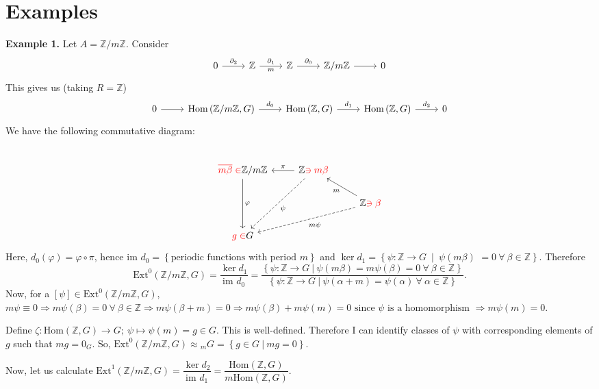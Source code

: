 \documentclass[a4paper,11pt, tikz]{article}
\newcommand{\lb}{\left(}
\newcommand{\rb}{\right)}
\newcommand{\lc}{\left\lbrace}
\newcommand{\rc}{\right\rbrace}
\newcommand{\Z}{\mathbb{Z}}
\renewcommand{\a}{\alpha}
\renewcommand{\b}{\beta}
\newcommand{\f}{\varphi}
\newcommand{\z}{\zeta}
\newcommand{\p}{\pi}
\newcommand{\dl}{\partial}
\newcommand{\Hom}{\text{Hom}}
\newcommand{\Ext}{\text{Ext}}
\newcommand{\im}{\text{im~}}
\renewcommand{\implies}{\Rightarrow}
\newcommand{\tends}{\rightarrow}
\newcommand{\cl}{\overline}
\begin{document}
\section{Examples}
\noindent{}\textbf{Example 1.} Let $A=\Z/m\Z$. Consider
\begin{equation*}
\begin{tikzcd}
0 \arrow[r, "\dl_2"] & \Z \arrow[r, "\dl_1", "m"'] & \Z \arrow[r, "\dl_0"] & {\Z/m\Z} \arrow[r] & 0
\end{tikzcd}
\end{equation*}
This gives us (taking $R=\Z$)
\begin{equation*}
\begin{tikzcd}
0 \arrow[r] & \Hom\lb \Z/m\Z, G\rb\arrow[r, "d_0"] & \Hom\lb \Z, G\rb \arrow[r, "d_1"] & \Hom\lb \Z, G\rb \arrow[r, "d_2"] & 0
\end{tikzcd}
\end{equation*}
We have the following commutative diagram:
\begin{equation*}
\begin{tikzcd}
&  &\\
\color{red}{\cl{m\b}\in}\color{black}{}\Z/m\Z \arrow[dd, "\f"] & \Z\color{red}{\ni m\b}\color{black}{} \arrow[l, "\p"'] \arrow [ddl, dashrightarrow, "\psi"] & \\
& & \Z\color{red}{\ni\b}\color{black}{} \arrow[ul, "m"] \arrow[dll, dashrightarrow, "m\psi"]\\
\color{red}{g\in}\color{black}{} G & &
\end{tikzcd}
\end{equation*}
Here, $d_0\lb \f\rb=\f\circ \pi$, hence $\im d_0=\lc \text{periodic functions with period } m\rc$ and $\ker d_1=\lc \psi: \Z\tends G~\mid~\psi\lb m\b\rb\right.$ $\left.=0~\forall~\b\in\Z\rc$. Therefore
$$\Ext^0\lb \Z/m\Z, G\rb=\dfrac{\ker d_1}{\im d_0}=\dfrac{\lc\psi:\Z\tends G~|~\psi\lb m\b\rb=m\psi\lb \b\rb=0~\forall~\b\in\Z\rc}{\lc \psi:\Z\tends G~|~\psi\lb \a+m\rb=\psi\lb \a\rb~\forall~\a\in\Z\rc}.$$
Now, for a $[\psi]\in\Ext^0\lb \Z/m\Z, G\rb$, $m\psi\equiv 0\implies m\psi\lb \b\rb=0~\forall~\b\in\Z\implies m\psi\lb \b+m\rb=0\implies m\psi(\b)+m\psi(m)=0\text{ since $\psi$ is a homomorphism }\implies m\psi(m)=0$.

Define $\z:\Hom\lb \Z, G\rb\tends G;~\psi\mapsto \psi(m)=g\in G$. This is well-defined. Therefore I can identify classes of $\psi$ with corresponding elements of $g$ such that $mg=0_G$. So, $\Ext^0\lb \Z/m\Z, G\rb\approx {}_mG=\lc g\in G~|~mg=0\rc$.

Now, let us calculate $\Ext^1\lb \Z/m\Z, G\rb=\dfrac{\ker d_2}{\im d_1}=\dfrac{\Hom\lb \Z, G\rb}{m\Hom\lb \Z, G\rb}$.\\
\end{document}
